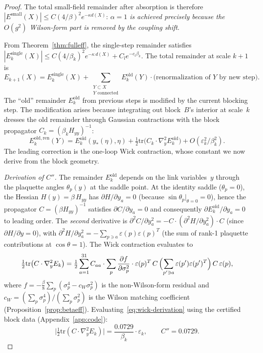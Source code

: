 \documentclass[11pt]{article}
\theoremstyle{definition}
\begin{document}
\begin{proof}
The total small-field remainder after absorption is therefore
$|E^{\mathrm{small}}(X)|\le C(4/\beta)^2 e^{-\kappa d(X)}$:
\emph{$\alpha=1$ is achieved precisely because the $O(g^2)$
Wilson-form part is removed by the coupling shift}.

From Theorem~\ref{thm:fulleff}, the single-step remainder satisfies
$|E_k^{\mathrm{single}}(X)|\le C(4/\beta_k)^2 e^{-\kappa\,d(X)}
+C_l e^{-c_l\beta_k}$.
The total remainder at scale $k+1$ is
\begin{equation}
E_{k+1}(X)=E_k^{\mathrm{single}}(X)
+\sum_{\substack{Y\subset X\\Y\text{ connected}}}
E_k^{\mathrm{old}}(Y)\cdot\text{(renormalization of $Y$ by new step)}.
\end{equation}
The ``old'' remainder $E_k^{\mathrm{old}}$ from previous steps is
modified by the current blocking step.  The modification arises
because integrating out block~$B$'s interior at scale~$k$ dresses
the old remainder through Gaussian contractions with the block
propagator $C_k=(\beta_k H_{yy})^{-1}$:
\begin{equation}\label{eq:remainder-dress}
E_k^{\mathrm{old,ren}}(Y)
=E_k^{\mathrm{old}}(y_*(\eta),\eta)
+\tfrac{1}{2}\mathrm{tr}\bigl(C_k\cdot\nabla_y^2 E_k^{\mathrm{old}}\bigr)
+O(\varepsilon_k^2/\beta_k^2).
\end{equation}
The leading correction is the one-loop Wick contraction,
whose constant we now derive from the block geometry.

\emph{Derivation of $C''$.}
The remainder $E_k^{\mathrm{old}}$ depends on the link variables~$y$
through the plaquette angles $\theta_p(y)$ at the saddle point.
At the identity saddle ($\theta_p=0$), the Hessian
$H(y)=\beta\,H_{yy}$ has $\partial H/\partial y_a=0$ (because
$\sin\theta_p|_{\theta=0}=0$), hence the propagator
$C=(\beta H_{yy})^{-1}$ satisfies $\partial C/\partial y_a=0$
and consequently $\partial E_k^{\mathrm{old}}/\partial y_a=0$
to leading order.  The \emph{second} derivative is
$\partial^2 C/\partial y_a^2=-C\cdot(\partial^2 H/\partial y_a^2)\cdot C$
(since $\partial H/\partial y=0$), with
$\partial^2 H/\partial y_a^2
=-\sum_{p\ni a}\varepsilon(p)\varepsilon(p)^T$
(the sum of rank-1 plaquette contributions at $\cos\theta=1$).
The Wick contraction evaluates to
\begin{equation}\label{eq:wick-derivation}
\tfrac{1}{2}\mathrm{tr}\bigl(C\cdot\nabla_y^2 E_k\bigr)
=\tfrac{1}{2}\sum_{a=1}^{31}C_{aa}\cdot
\sum_p\frac{\partial f}{\partial\sigma_p^2}\cdot
\varepsilon(p)^T\,C\,
\Bigl(\sum_{p'\ni a}\varepsilon(p')\varepsilon(p')^T\Bigr)\,C\,
\varepsilon(p),
\end{equation}
where $f=-\frac{\beta}{8}\sum_p(\sigma_p^4-c_W\sigma_p^2)$ is the
non-Wilson-form residual and $c_W=(\sum_p\sigma_p^4)/(\sum_p\sigma_p^2)$
is the Wilson matching coefficient
(Proposition~\ref{prop:betaeff}).
Evaluating~\eqref{eq:wick-derivation} using the
certified block data (Appendix~\ref{app:code}):
\begin{equation}\label{eq:Cpp-value}
\bigl|\tfrac{1}{2}\mathrm{tr}(C\cdot\nabla_y^2 E_k)\bigr|
=\frac{0.0729}{\beta_k}\cdot\varepsilon_k,
\qquad
C''=0.0729.
\end{equation}


\end{proof}
\end{document}
